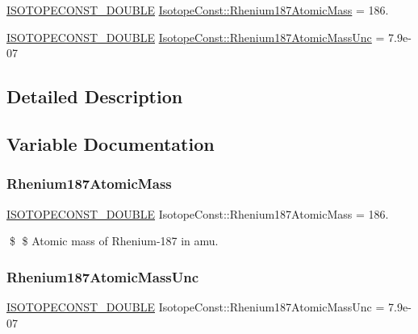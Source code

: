 \begin{DoxyCompactItemize}
\item 
\mbox{\hyperlink{group___isotope_const-_macros_ga8f45a7272ce02c0b4c65c44636ed719a}{I\+S\+O\+T\+O\+P\+E\+C\+O\+N\+S\+T\+\_\+\+D\+O\+U\+B\+LE}} \mbox{\hyperlink{group___isotope_const-_rhenium-_re187_gaacf14ef8be6ca7c93a53be1b4efad1be}{Isotope\+Const\+::\+Rhenium187\+Atomic\+Mass}} = 186.
\item 
\mbox{\hyperlink{group___isotope_const-_macros_ga8f45a7272ce02c0b4c65c44636ed719a}{I\+S\+O\+T\+O\+P\+E\+C\+O\+N\+S\+T\+\_\+\+D\+O\+U\+B\+LE}} \mbox{\hyperlink{group___isotope_const-_rhenium-_re187_gad63136692d936e054ff1d102fa36f257}{Isotope\+Const\+::\+Rhenium187\+Atomic\+Mass\+Unc}} = 7.\+9e-\/07
\end{DoxyCompactItemize}


\subsection{Detailed Description}


\subsection{Variable Documentation}
\mbox{\label{group___isotope_const-_rhenium-_re187_gaacf14ef8be6ca7c93a53be1b4efad1be}} 
\subsubsection{\texorpdfstring{Rhenium187\+Atomic\+Mass}{Rhenium187AtomicMass}}
{\footnotesize\ttfamily \mbox{\hyperlink{group___isotope_const-_macros_ga8f45a7272ce02c0b4c65c44636ed719a}{I\+S\+O\+T\+O\+P\+E\+C\+O\+N\+S\+T\+\_\+\+D\+O\+U\+B\+LE}} Isotope\+Const\+::\+Rhenium187\+Atomic\+Mass = 186.}

\$ \$ Atomic mass of Rhenium-\/187 in amu. \mbox{\label{group___isotope_const-_rhenium-_re187_gad63136692d936e054ff1d102fa36f257}} 
\subsubsection{\texorpdfstring{Rhenium187\+Atomic\+Mass\+Unc}{Rhenium187AtomicMassUnc}}
{\footnotesize\ttfamily \mbox{\hyperlink{group___isotope_const-_macros_ga8f45a7272ce02c0b4c65c44636ed719a}{I\+S\+O\+T\+O\+P\+E\+C\+O\+N\+S\+T\+\_\+\+D\+O\+U\+B\+LE}} Isotope\+Const\+::\+Rhenium187\+Atomic\+Mass\+Unc = 7.\+9e-\/07}

